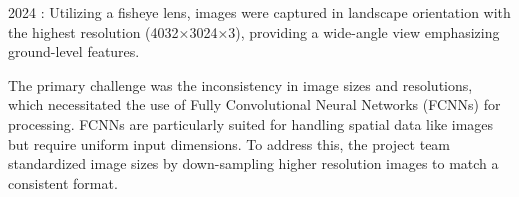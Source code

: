    2024 : Utilizing a fisheye lens, images were captured in landscape orientation with the highest resolution (4032×3024×3), providing a wide-angle view emphasizing ground-level features. 

The primary challenge was the inconsistency in image sizes and resolutions, which necessitated the use of Fully Convolutional Neural Networks (FCNNs) for processing. FCNNs are particularly suited for handling spatial data like images but require uniform input dimensions. To address this, the project team standardized image sizes by down-sampling higher resolution images to match a consistent format. 

